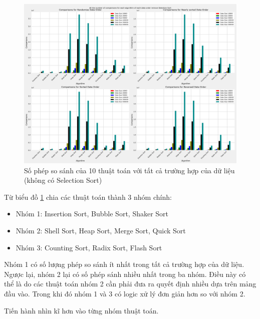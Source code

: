 \begin{figure}[H]
    \centering
    \includegraphics[width=\textwidth]{experimental_result/images/all_the_number_of_comparisons_for_each_algorithm_of_each_data_order_remove_selection_sort.png}
    \caption{Số phép so sánh của 10 thuật toán với tất cả trường hợp của dữ liệu (không có Selection Sort)}
    \label{fig:all_the_number_of_comparisons_for_each_algorithm_of_each_data_order_remove_selection_sort}
\end{figure}


Từ biểu đồ \ref{fig:all_the_number_of_comparisons_for_each_algorithm_of_each_data_order_remove_selection_sort} chia các thuật toán thành 3 nhóm chính: 
\begin{itemize}
    \item Nhóm 1: Insertion Sort, Bubble Sort, Shaker Sort 
    \item Nhóm 2: Shell Sort, Heap Sort, Merge Sort, Quick Sort
    \item Nhóm 3: Counting Sort, Radix Sort, Flash Sort
\end{itemize}

Nhóm 1 có số lượng phép so sánh ít nhất trong tất cả trường hợp của dữ liệu. Ngược lại, nhóm 2 lại có số phép sánh nhiều nhất trong ba nhóm. Điều này có thể là do các thuật toán nhóm 2 cần phải đưa ra quyết định nhiều dựa trên mảng đầu vào. Trong khi đó nhóm 1 và 3 có logic xử lý đơn giản hơn so với nhóm 2.

Tiến hành nhìn kĩ hơn vào từng nhóm thuật toán.

